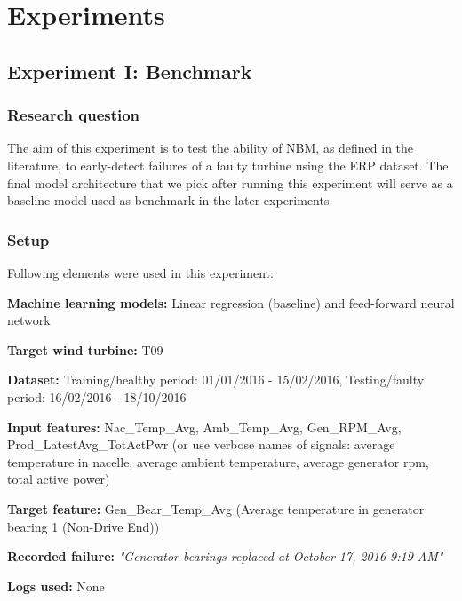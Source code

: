 \chapter{Experiments}
\label{chap:experiments}
\minitoc

\section{Experiment I: Benchmark}
\label{exp:I}

\subsection{Research question}
The aim of this experiment is to test the ability of NBM, as defined in the literature, to early-detect failures of a faulty turbine using the ERP dataset. The final model architecture that we pick after running this experiment will serve as a baseline model used as benchmark in the later experiments.
\subsection{Setup}
Following elements were used in this experiment:
\begin{bulletList}
 \item \textbf{Machine learning models:} Linear regression (baseline) and feed-forward neural network
 \item \textbf{Target wind turbine:} T09
 \item \textbf{Dataset:} Training/healthy period: 01/01/2016 - 15/02/2016, Testing/faulty period: 16/02/2016 - 18/10/2016
 \item \textbf{Input features:} Nac\_Temp\_Avg, Amb\_Temp\_Avg, Gen\_RPM\_Avg, Prod\_LatestAvg\_TotActPwr (or use verbose names of signals: average temperature in nacelle, average ambient temperature, average generator rpm, total active power)
 \item \textbf{Target feature: } Gen\_Bear\_Temp\_Avg (Average temperature in generator bearing 1 (Non-Drive End))
  \item \textbf{Recorded failure:} \textit{"Generator bearings replaced at October 17, 2016 9:19 AM"}
 \item \textbf{Logs used:} None
\end{bulletList}


